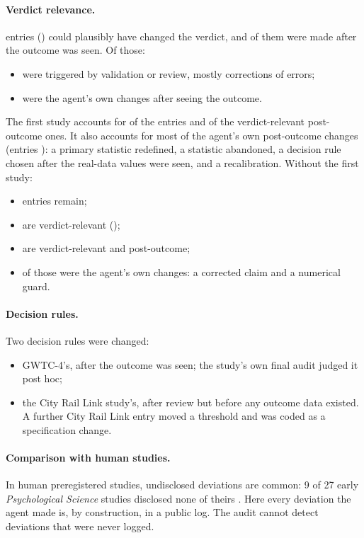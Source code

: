 \paragraph{Verdict relevance.} \DevRelevant{} entries (\CIDevRelevant{}) could plausibly have changed the verdict, and
\DevRelevantAfter{} of them were made after the outcome was seen. Of those:
\begin{itemize}
\item \DevRelevantAfterValRev{} were triggered by validation or review, mostly corrections of errors;
\item \DevRelevantAfterExec{} were the agent's own changes after seeing the outcome.
\end{itemize}
The first study accounts for \DevGWTC{} of the \DevN{} entries and \DevRelevantAfterGWTC{} of the \DevRelevantAfter{}
verdict-relevant post-outcome ones. It also accounts for most of the agent's own post-outcome changes (entries
\GWTCExecAfterIDs{}): a primary statistic redefined, a statistic abandoned, a decision rule chosen after the real-data
values were seen, and a recalibration. Without the first study:
\begin{itemize}
\item \DevNNoG{} entries remain;
\item \DevRelevantNoG{} are verdict-relevant (\CIDevRelevantNoG{});
\item \DevRelevantAfterNoG{} are verdict-relevant and post-outcome;
\item \DevRelevantAfterExecNoG{} of those were the agent's own changes: a corrected claim and a numerical guard.
\end{itemize}

\paragraph{Decision rules.} Two decision rules were changed:
\begin{itemize}
\item GWTC-4's, after the outcome was seen; the study's own final audit judged it post hoc;
\item the City Rail Link study's, after review but before any outcome data existed. A further City Rail Link entry
moved a threshold and was coded as a specification change.
\end{itemize}

\paragraph{Comparison with human studies.} In human preregistered studies, undisclosed deviations are common: 9 of 27
early \emph{Psychological Science} studies disclosed none of theirs \citep{claesen2021dream}. Here every deviation the
agent made is, by construction, in a public log. The audit cannot detect deviations that were never logged.

